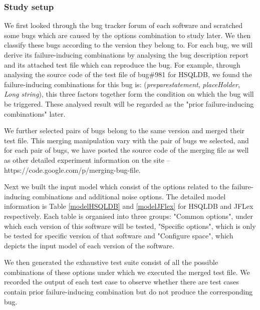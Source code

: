 \documentclass{sig-alternate}
\begin{document}


\subsubsection{Study setup}
We first looked through the bug tracker forum of each software and scratched some bugs which are caused by the options combination to study later. We then classify these bugs according to the version they belong to. For each bug, we will derive its failure-inducing combinations by analysing the bug description report and its attached test file which can reproduce the bug. For example, through analysing the source code of the test file of bug\#981 for HSQLDB, we found the failure-inducing combinations for this bug is: (\emph{preparestatement}, \emph{placeHolder}, \emph{Long string}), this three factors together form the condition on which the bug will be triggered. These analysed result will be regarded as the "prior failure-inducing combinations" later.

We further selected pairs of bugs belong to the same version and merged their test file. This merging manipulation vary with the pair of bugs we selected, and for each pair of bugs, we have posted the source code of the merging file as well as other detailed experiment information on the site -- https://code.google.com/p/merging-bug-file.

Next we built the input model which consist of the options related to the failure-inducing combinations and additional noise options. The detailed model information is Table \ref{modelHSQLDB} and \ref{modelJFlex} for HSQLDB and JFLex respectively. Each table is organised into three groups: "Common options", under which each version of this software will be tested, "Specific options", which is only be tested for specific version of that software and "Configure space", which depicts the input model of each version of the software.

We then generated the exhaustive test suite consist of all the possible combinations of these options under which we executed the merged test file. We recorded the output of each test case to observe whether there are test cases contain prior failure-inducing combination but do not produce the corresponding bug.
\end{document}
